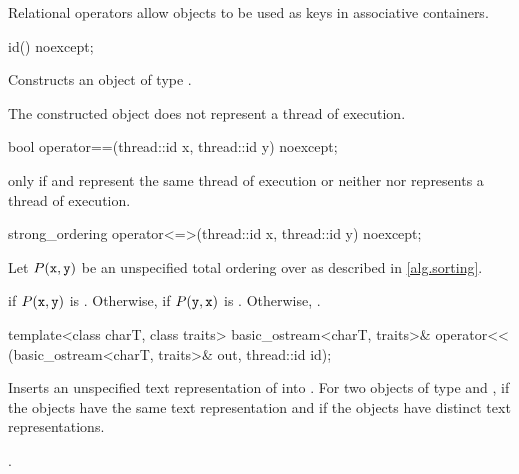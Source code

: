 \pnum
\begin{note} Relational operators allow  objects to be used as
keys in associative containers. \end{note}

%
\begin{itemdecl}
id() noexcept;
\end{itemdecl}

\begin{itemdescr}
\pnum\effects Constructs an object of type .

\pnum\ensures The constructed object does not represent a thread of execution.
\end{itemdescr}

%
\begin{itemdecl}
bool operator==(thread::id x, thread::id y) noexcept;
\end{itemdecl}

\begin{itemdescr}
\pnum\returns {} only if  and  represent the same
thread of execution or neither  nor  represents a thread of
execution.
\end{itemdescr}

%
\begin{itemdecl}
strong_ordering operator<=>(thread::id x, thread::id y) noexcept;
\end{itemdecl}

\begin{itemdescr}
\pnum
Let $P(\texttt{x}, \texttt{y})$ be
an unspecified total ordering over 
as described in \ref{alg.sorting}.

\pnum
\returns
{} if $P(\texttt{x}, \texttt{y})$ is .
Otherwise, 
if $P(\texttt{y}, \texttt{x})$ is .
Otherwise, .
\end{itemdescr}

%
\begin{itemdecl}
template<class charT, class traits>
  basic_ostream<charT, traits>&
    operator<< (basic_ostream<charT, traits>& out, thread::id id);
\end{itemdecl}

\begin{itemdescr}
\pnum\effects Inserts an unspecified text representation of  into
. For two objects of type   and ,
if  the  objects have the same text
representation and if  the  objects have
distinct text representations.

\pnum\returns {}.
\end{itemdescr}

